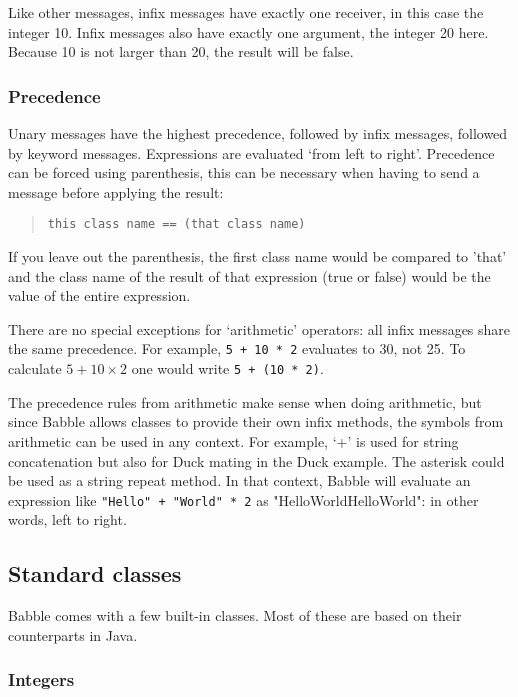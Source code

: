 \documentclass[a4paper]{article}
\begin{document}
Like other messages, infix messages have exactly one receiver, in this case the integer 10.
Infix messages also have exactly one argument, the integer 20 here.
Because 10 is not larger than 20, the result will be false.


\subsubsection{Precedence}

Unary messages have the highest precedence, followed by infix messages, followed by keyword messages. Expressions are evaluated `from left to right'. Precedence can be forced using parenthesis, this can be necessary when having to send a message before applying the result:
\begin{quote}
\begin{lstlisting}
this class name == (that class name)
\end{lstlisting}
\end{quote}
If you leave out the parenthesis, the first class name would be compared to 'that' and the class name of the result of that expression (true or false) would be the value of the entire expression.

There are no special exceptions for `arithmetic' operators: all infix messages share the same precedence.
For example, \texttt{5 + 10 * 2} evaluates to 30, not 25.
To calculate $5 + 10 \times 2$ one would write \texttt{5 + (10 * 2)}.

The precedence rules from arithmetic make sense when doing arithmetic, but since Babble allows classes to provide their own infix methods, the symbols from arithmetic can be used in any context.
For example, `+' is used for string concatenation but also for Duck mating in the Duck example.
The asterisk could  be used as a string repeat method.
In that context, Babble will evaluate an expression like \texttt{"Hello" + "World" * 2} as "HelloWorldHelloWorld": in other words, left to right.

\subsection{Standard classes}

Babble comes with a few built-in classes. Most of these are based on their counterparts in Java.

\subsubsection{Integers}
\end{document}

